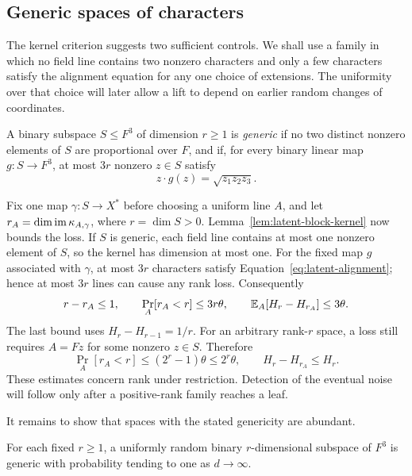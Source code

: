\subsection{Generic spaces of characters}

The kernel criterion suggests two sufficient controls.  We shall use a
family in which no field line contains two nonzero characters and only a few
characters satisfy the alignment equation for any one choice of extensions.
The uniformity over that choice will later allow a lift to depend on earlier
random changes of coordinates.

\begin{definition}
A binary subspace $S\le F^3$ of dimension $r\ge1$ is \emph{generic} if
no two distinct nonzero elements of $S$ are proportional over $F$, and if,
for every binary linear map $g:S\to F^3$, at most $3r$ nonzero $z\in S$
satisfy
\begin{equation}\label{eq:latent-alignment}
 z\cdot g(z)=\sqrt{z_1z_2z_3}.
\end{equation}
\end{definition}

Fix one map $\gamma:S\to X^*$ before choosing a uniform line $A$, and let
$r_A=\dim\operatorname{im}\kappa_{A,\gamma}$, where $r=\dim S>0$.
Lemma~\ref{lem:latent-block-kernel} now bounds the loss.  If $S$ is generic,
each field line contains at most one nonzero element of $S$, so the kernel
has dimension at most one.  For the fixed map $g$ associated with
$\gamma$, at most $3r$ characters satisfy Equation~\eqref{eq:latent-alignment};
hence at most $3r$ lines can cause any rank loss.  Consequently
\begin{equation}\label{eq:latent-generic-rank-loss}
 r-r_A\le1,\qquad
 \Pr_A[r_A<r]\le3r\theta,\qquad
 \mathbb E_A[H_r-H_{r_A}]\le3\theta.
\end{equation}
The last bound uses $H_r-H_{r-1}=1/r$.
For an arbitrary rank-$r$ space, a loss still requires $A=Fz$ for some
nonzero $z\in S$.  Therefore
\begin{equation}\label{eq:latent-arbitrary-rank-loss}
 \Pr_A[r_A<r]\le(2^r-1)\theta\le2^r\theta,
 \qquad H_r-H_{r_A}\le H_r.
\end{equation}
These estimates concern rank under restriction.  Detection of the eventual
noise will follow only after a positive-rank family reaches a leaf.

It remains to show that spaces with the stated genericity are abundant.

\begin{lemma}\label{lem:latent-generic}
For each fixed $r\ge1$, a uniformly random binary $r$-dimensional subspace
of $F^3$ is generic with probability tending to one as $d\to\infty$.
\end{lemma}

